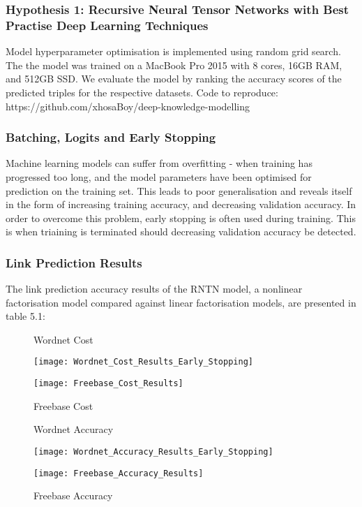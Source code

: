 
\subsubsection{Hypothesis 1: \newline 
Recursive Neural Tensor Networks with Best Practise Deep Learning Techniques}
Model hyperparameter optimisation is implemented using random grid search. The the model was trained on a MacBook Pro 2015 with 8 cores, 16GB RAM, and 512GB SSD. \newline
We evaluate the model by ranking the accuracy scores of the predicted triples for the respective datasets. Code to reproduce: https://github.com/xhosaBoy/deep-knowledge-modelling

\subsubsection{Batching, Logits and Early Stopping}
Machine learning models can suffer from overfitting \cite{reference} - when training has progressed too long, and the model parameters have been optimised for prediction on the training set. This leads to poor generalisation  and reveals itself in the form of increasing training accuracy, and decreasing validation accuracy. In order to overcome this problem, early stopping is often used during training. This is when triaining is terminated should decreasing validation accuracy be detected.\newline

\subsubsection{Link Prediction Results}
The link prediction accuracy results of the RNTN model, a nonlinear factorisation model compared against linear factorisation models, are presented in table 5.1:

\begin{figure}[H]
	\parbox{.5\linewidth}{
   		\caption{Wordnet Cost}
   		\centering
    		\texttt{[image: Wordnet\_Cost\_Results\_Early\_Stopping]}
		}
	\hfill
	\parbox{.5\linewidth}{
		\caption{Freebase Cost}
   		\centering
		\texttt{[image: Freebase\_Cost\_Results]}
		}
\end{figure}


\begin{figure}[H]
	\parbox{.5\linewidth}{
   		\caption{Wordnet Accuracy}
   		\centering
    		\texttt{[image: Wordnet\_Accuracy\_Results\_Early\_Stopping]}
		}
	\hfill
	\parbox{.5\linewidth}{
		\caption{Freebase Accuracy}
   		\centering
		\texttt{[image: Freebase\_Accuracy\_Results]}
		}
\end{figure}



